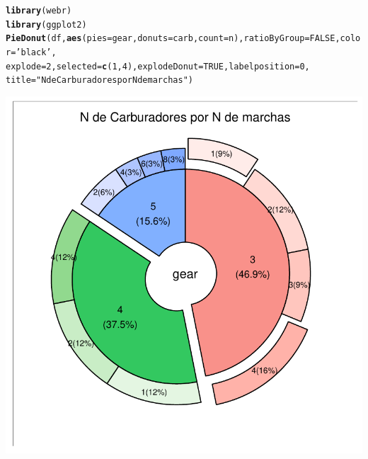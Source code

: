 \documentclass{article}\usepackage[]{graphicx}\usepackage[]{color}
\makeatletter
\def\maxwidth{ %
  \ifdim\Gin@nat@width>\linewidth
    \linewidth
  \else
    \Gin@nat@width
  \fi
}
\newcommand{\hlnum}[1]{\textcolor[rgb]{0.686,0.059,0.569}{#1}}%
\newcommand{\hlstr}[1]{\textcolor[rgb]{0.192,0.494,0.8}{#1}}%
\newcommand{\hlstd}[1]{\textcolor[rgb]{0.345,0.345,0.345}{#1}}%
\newcommand{\hlkwc}[1]{\textcolor[rgb]{0.333,0.667,0.333}{#1}}%
\newcommand{\hlkwd}[1]{\textcolor[rgb]{0.737,0.353,0.396}{\textbf{#1}}}%
\newenvironment{kframe}{%
 \def\at@end@of@kframe{}%
 \ifinner\ifhmode%
  \def\at@end@of@kframe{\end{minipage}}%
  \begin{minipage}{\columnwidth}%
 \fi\fi%
 \def\FrameCommand##1{\hskip\@totalleftmargin \hskip-\fboxsep
 \colorbox{shadecolor}{##1}\hskip-\fboxsep
     \hskip-\linewidth \hskip-\@totalleftmargin \hskip\columnwidth}%
 \MakeFramed {\advance\hsize-\width
   \@totalleftmargin\z@ \linewidth\hsize
   \@setminipage}}%
 {\par\unskip\endMakeFramed%
 \at@end@of@kframe}
\newenvironment{knitrout}{}{} %
\makeatother
\begin{document}
\begin{knitrout}
\color{fgcolor}\begin{kframe}
\begin{alltt}
\hlkwd{library}\hlstd{(webr)}
\hlkwd{library}\hlstd{(ggplot2)}
\hlkwd{PieDonut}\hlstd{(df,}\hlkwd{aes}\hlstd{(}\hlkwc{pies}\hlstd{=gear,}\hlkwc{donuts}\hlstd{=carb,}\hlkwc{count}\hlstd{=n),}\hlkwc{ratioByGroup}\hlstd{=}\hlnum{FALSE}\hlstd{,} \hlkwc{color} \hlstd{=} \hlstr{'black'}\hlstd{,}
         \hlkwc{explode} \hlstd{=} \hlnum{2}\hlstd{,} \hlkwc{selected} \hlstd{=} \hlkwd{c}\hlstd{(}\hlnum{1}\hlstd{,}\hlnum{4}\hlstd{),} \hlkwc{explodeDonut} \hlstd{=} \hlnum{TRUE}\hlstd{,} \hlkwc{labelposition}\hlstd{=}\hlnum{0}\hlstd{,}
         \hlkwc{title}\hlstd{=}\hlstr{"N de Carburadores por N de marchas"}\hlstd{)}
\end{alltt}
\end{kframe}

{\centering \includegraphics[width=\maxwidth]{figure/plot_webr-1} 

}



\end{knitrout}
\clearpage
\end{document}
